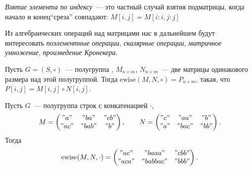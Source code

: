 \begin{definition}
    \emph{Взятие элемента по индексу}~--- это частный случай взятия подматрицы, когда начало и конец\enquote{среза} совпадают: $M[i, j] = M[i : i, j : j]$
\end{definition}

Из алгебраических операций над матрицами нас в дальнейшем будут интересовать \emph{поэлементные операции}, \emph{скалярные операции}, \emph{матричное умножение}, \emph{произведение Кронекера}.

\begin{definition}
    Пусть $G = (S, \circ)$~--- полугруппа%
    , $M_{n \times m}$, $N_{n \times m}$~--- две матрицы одинакового размера над этой полугруппой.
    Тогда $\mathrm{ewise}(M, N, \circ) = P_{n \times m}$, такая, что $P[i, j] = M[i, j] \circ N[i, j]$.
\end{definition}

\begin{example}
    Пусть $G$~--- полугруппа строк с конкатенацией $\cdot$,
    \[M =
        \begin{pmatrix}
            "a"  & "ba"  & "cb" \\
            "ac" & "bab" & "b"
        \end{pmatrix},
        \qquad
        N =
        \begin{pmatrix}
            "c" & "aa"  & "b"  \\
            "a" & "bac" & "bb"
        \end{pmatrix}.
    \]
    Тогда
    \[
        \mathrm{ewise}(M, N, \cdot) =
        \begin{pmatrix}
            "ac"  & "baaa"   & "cbb" \\
            "aca" & "babbac" & "bbb"
        \end{pmatrix}.
    \]
\end{example}

